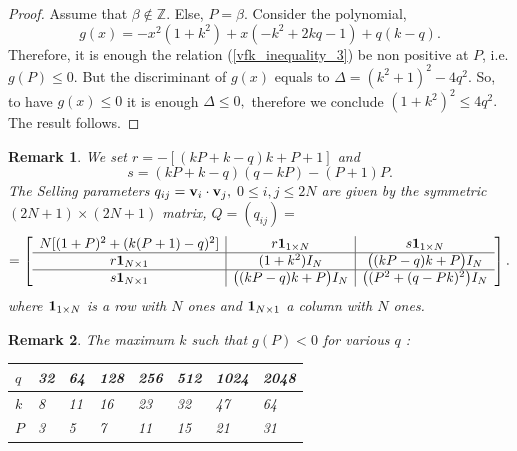 \documentclass{amsart}
\newtheorem{remark}{Remark}[section]
\numberwithin{equation}{section}
\begin{document}
{\begin{proof}
Assume that $\beta\not\in {\mathbb{Z}}.$
Else, $P=\beta.$ 
Consider the polynomial, 
$$g(x) = -x^2(1+k^2)+x(-k^2+2kq-1)+q(k-q).$$
Therefore, it is enough the relation (\ref{vfk_inequality_3}) be non positive at $P$, i.e. $g(P)\leq 0.$
But the discriminant of $g(x)$ equals to $\Delta = (k^2+1)^2-4q^2.$ So, to have $g(x)\leq 0$ it is enough $\Delta\leq 0,$ therefore we conclude $(1+k^2)^2\le 4q^2.$ The result follows.
\end{proof}
\begin{remark}
We set $r = - [(kP+k-q)k+P+1]$ and $$s=(kP+k-q)(q-kP)-(P+1)P.$$ 
The Selling parameters $q_{ij}={\bf v}_i\cdot {\bf v}_j,$ $0\le i,j\le 2N$ are given by the symmetric $(2N+1)\times (2N+1)$ matrix, $Q=(q_{ij})=$
$$=\left[\begin{array}{c|c|c}
N[(1+P)^2+(k(P+1)-q)^2] & r{\bf 1}_{1\times N}  & s{\bf 1}_{1\times N} \\
\hline
r{\bf 1}_{N\times 1}  & (1+k^2)I_N & \big((kP-q)k+P\big)I_N  \\
\hline
s{\bf 1}_{N\times 1} &  \big((kP-q)k+P\big)I_N & \big((P^2+(q-Pk)^2\big)I_N   \\
\end{array}\right].
$$
where ${\bf 1}_{1\times N}$ is a row with $N$ ones and ${\bf 1}_{N\times 1}$ a column with $N$ ones.

\end{remark}
\begin{remark}
The maximum $k$ such that $g(P)<0$ for various $q$ :

\begin{table}[h]

\begin{tabular}{|l||l|l|l|l|l|l|l|}
\hline 
$q$ & 32 & 64 & 128 & 256 & 512 & 1024 &2048\\ \hline
$k$ & 8 & 11 & 16 & 23 & 32 & 47 & 64 \\ \hline
$P$ & 3 & 5 & 7 & 11 & 15 & 21 & 31 \\  \hline
\end{tabular}
\label{Tab:1}
\end{table} 

\end{remark}

}
\end{document}
